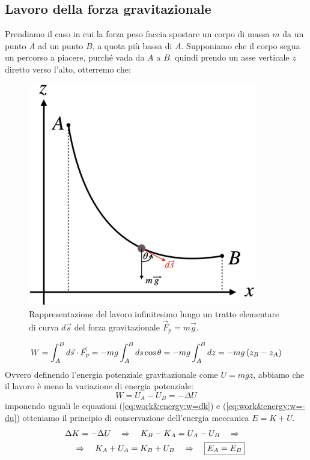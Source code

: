 \subsection{Lavoro della forza gravitazionale}
Prendiamo il caso in cui la forza peso faccia spostare un corpo di massa $m$
da un punto $A$ ad un punto $B$, a quota più bassa di $A$. Supponiamo che il corpo segua un percorso a piacere, purché vada da $A$ a $B$. quindi prendo un asse verticale $z$ diretto verso l'alto, otterremo che:
\begin{figure}[htbp]
    \begin{center}
        \includegraphics[width=10cm]{images/lavorog.png}
        \caption{Rappresentazione del lavoro infinitesimo lungo un tratto
        elementare di curva $d\vec s$ del forza gravitazionale
        $\vec F_p = m\vec g$.}
\end{center}
\label{fig:work&energy:P_work}
\end{figure}

\begin{equation}
    W = \int_A^Bd\vec s \cdot\vec F_p = -mg\int_A^Bds\cos\theta =
    -mg\int_A^Bdz = -mg\left( z_B-z_A\right)
\end{equation}
Ovvero definendo l'energia potenziale gravitazionale come $U = mgz$, abbiamo
che il lavoro è meno la variazione di energia potenziale:
\begin{equation}
    W = U_A-U_B = -\Delta U
\label{eq:work&energy:w=-du}
\end{equation}
imponendo uguali le equazioni (\ref{eq:work&energy:w=dk}) e (\ref{eq:work&energy:w=-du})
otteniamo il principio di conservazione dell'energia meccanica $E = K + U$.
\begin{multline}
    \Delta K = -\Delta U\quad\Rightarrow\quad K_B-K_A = U_A -U_B\quad\Rightarrow\quad
    \\\quad\Rightarrow\quad K_A+U_A = K_B+U_B\quad\Rightarrow\quad
    \boxed{E_A = E_B}
\end{multline}
